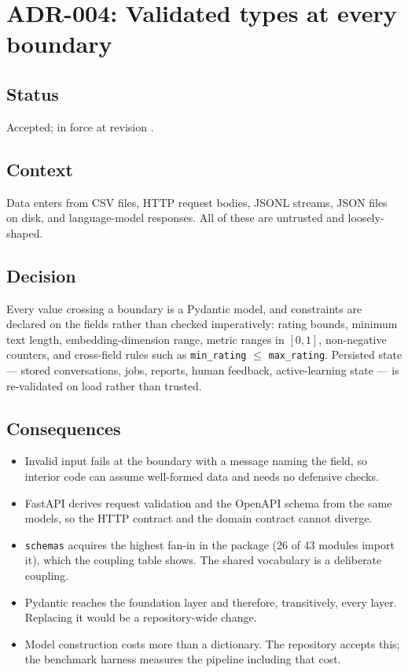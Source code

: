 \section{ADR-004: Validated types at every boundary}
\label{adr:004}

\subsection*{Status}

Accepted; in force at revision \texttt{\projectrevisionshort}.

\subsection*{Context}

Data enters from CSV files, HTTP request bodies, JSONL streams, JSON files on
disk, and language-model responses. All of these are untrusted and
loosely-shaped.

\subsection*{Decision}

Every value crossing a boundary is a Pydantic model, and constraints are
declared on the fields rather than checked imperatively: rating bounds,
minimum text length, embedding-dimension range, metric ranges in $[0,1]$,
non-negative counters, and cross-field rules such as
\texttt{min\_rating} $\leq$ \texttt{max\_rating}. Persisted state --- stored
conversations, jobs, reports, human feedback, active-learning state --- is
re-validated on load rather than trusted.

\subsection*{Consequences}

\begin{itemize}
  \item Invalid input fails at the boundary with a message naming the field, so
    interior code can assume well-formed data and needs no defensive checks.
  \item FastAPI derives request validation and the OpenAPI schema from the same
    models, so the HTTP contract and the domain contract cannot diverge.
  \item \texttt{schemas} acquires the highest fan-in in the package (26 of 43
    modules import it), which the coupling table shows. The shared vocabulary
    is a deliberate coupling.
  \item Pydantic reaches the foundation layer and therefore, transitively,
    every layer. Replacing it would be a repository-wide change.
  \item Model construction costs more than a dictionary. The repository accepts
    this; the benchmark harness measures the pipeline including that cost.
\end{itemize}

